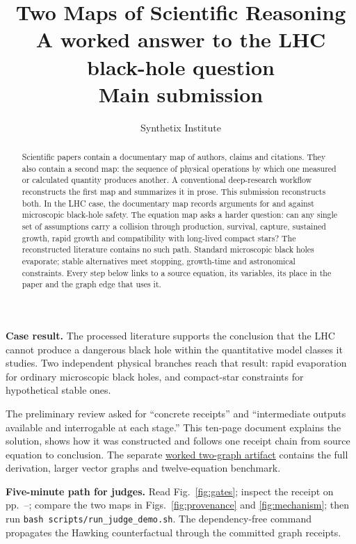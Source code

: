 \documentclass[10pt]{article}
\title{\vspace{-1.5em}\textbf{Two Maps of Scientific Reasoning}\\[0.35em]
\large A worked answer to the LHC black-hole question\\[0.3em]
\normalsize Main submission}
\author{Synthetix Institute}
\date{}
\newcommand{\resultbox}[1]{%
  \par\smallskip\noindent\begingroup\setlength{\fboxsep}{9pt}%
  \colorbox{greenbg}{\parbox{\dimexpr\linewidth-2\fboxsep\relax}{\color{ink}\textbf{Case result.} #1}}%
  \endgroup\par\smallskip}
\newcommand{\judgebox}[1]{%
  \par\smallskip\noindent\begingroup\setlength{\fboxsep}{8pt}%
  \colorbox{bluebg}{\parbox{\dimexpr\linewidth-2\fboxsep\relax}{\color{ink}#1}}%
  \endgroup\par\smallskip}
\begin{document}
\maketitle
\vspace{-1.6em}

\begin{abstract}
Scientific papers contain a documentary map of authors, claims and citations. They also contain a second map: the sequence of physical operations by which one measured or calculated quantity produces another. A conventional deep-research workflow reconstructs the first map and summarizes it in prose. This submission reconstructs both. In the LHC case, the documentary map records arguments for and against microscopic black-hole safety. The equation map asks a harder question: can any single set of assumptions carry a collision through production, survival, capture, sustained growth, rapid growth and compatibility with long-lived compact stars? The reconstructed literature contains no such path. Standard microscopic black holes evaporate; stable alternatives meet stopping, growth-time and astronomical constraints. Every step below links to a source equation, its variables, its place in the paper and the graph edge that uses it.
\end{abstract}

\resultbox{The processed literature supports the conclusion that the LHC cannot produce a dangerous black hole within the quantitative model classes it studies. Two independent physical branches reach that result: rapid evaporation for ordinary microscopic black holes, and compact-star constraints for hypothetical stable ones.}

The preliminary review asked for ``concrete receipts'' and ``intermediate outputs available and interrogable at each stage.'' This ten-page document explains the solution, shows how it was constructed and follows one receipt chain from source equation to conclusion. The separate \href{https://github.com/synthetix-institute/lhc-mechanism-audit/blob/main/paper/lhc_black_hole_answer.pdf}{worked two-graph artifact} contains the full derivation, larger vector graphs and twelve-equation benchmark.

\judgebox{\textbf{Five-minute path for judges.} Read Fig.~\ref{fig:gates}; inspect the receipt on pp.~\pageref{sec:receipt}--\pageref{sec:receipt-end}; compare the two maps in Figs.~\ref{fig:provenance} and \ref{fig:mechanism}; then run \texttt{bash scripts/run\_judge\_demo.sh}. The dependency-free command propagates the Hawking counterfactual through the committed graph receipts.}
\end{document}
